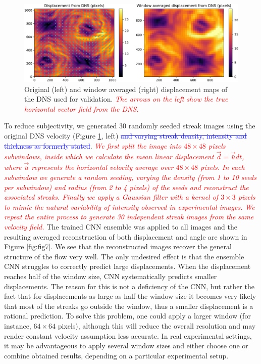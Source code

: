 \documentclass{svjour3}                     %
\newcommand{\new}[1]{\textit{\textcolor{red}{#1}}}
\newcommand{\old}[1]{\textcolor{blue}{\sout{#1}}}
\begin{document}
\begin{figure}
\includegraphics[width=\textwidth]{figs/figure5.png}
\caption{Original (left) and window averaged (right) displacement maps of the DNS \cite{plumley2016effects} used for validation. \new{The arrows on the left show the true horizontal vector field from the DNS.}}
\label{fig:fig6}
\end{figure}

To reduce subjectivity, we generated 30 randomly seeded streak images using the original DNS velocity (Figure \ref{fig:fig6}, left) \old{and varying streak density, intensity and thickness as formerly stated}. \new{We first split the image into $48\times48$ pixels subwindows, inside which we calculate the mean linear displacement $\vec{d}=\vec{\bar{u}}dt$, where $\vec{\bar{u}}$ represents the horizontal velocity average over $48\times48$ pixels. In each subwindow we generate a random seeding, varying the density (from 1 to 10 seeds per subwindow) and radius (from 2 to 4 pixels) of the seeds and reconstruct the associated streaks. Finally we apply a Gaussian filter with a kernel of $3\times 3$ pixels to mimic the natural variability of intensity observed in experimental images. We repeat the entire process to generate 30 independent streak images from the same velocity field. }
The trained CNN ensemble was applied to all images and the resulting averaged reconstruction of both displacement and angle are shown in Figure \ref{fig:fig7}. We see that the reconstructed images recover the general structure of the flow very well. The only undesired effect is that the ensemble CNN struggles to correctly predict large displacements. When the displacement reaches half of the window size, CNN systematically predicts smaller displacements. The reason for this is not a deficiency of the CNN, but rather the fact that for displacements as large as half the window size it becomes very likely that most of the streaks go outside the window, thus a smaller displacement is a rational prediction. To solve this problem, one could apply a larger window (for instance, $64\times 64$ pixels), although this will reduce the overall resolution and may render constant velocity assumption less accurate. In real experimental settings, it may be advantageous to apply several window sizes and either choose one or combine obtained results, depending on a particular experimental setup.
\end{document}
